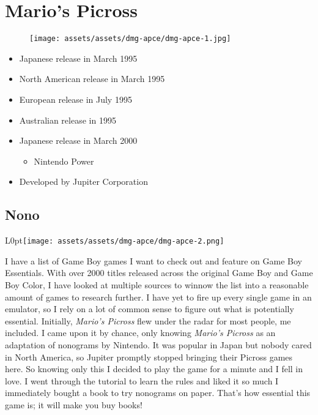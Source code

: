 \documentclass{book}
\begin{document}
\chapter*{Mario’s Picross}
\vspace{\baselineskip}\begin{figure}[H]{\texttt{[image: assets/assets/dmg-apce/dmg-apce-1.jpg]}}\end{figure}\vspace{\baselineskip}
\begin{itemize}[left=0pt, nosep]
\item Japanese release in March 1995
\item North American release in March 1995
\item European release in July 1995
\item Australian release in 1995
\item Japanese release in March 2000
\begin{itemize}
\item Nintendo Power
\end{itemize}
\item Developed by Jupiter Corporation

\end{itemize}
\newpage\FloatBarrier\section*{Nono}
\begin{wrapfigure}{L}{0pt}{\texttt{[image: assets/assets/dmg-apce/dmg-apce-2.png]}}\end{wrapfigure}\noindent
I have a list of Game Boy games I want to check out and feature on Game Boy Essentials. With over 2000 titles released across the original Game Boy and Game Boy Color, I have looked at multiple sources to winnow the list into a reasonable amount of games to research further. I have yet to fire up every single game in an emulator, so I rely on a lot of common sense to figure out what is potentially essential. Initially, \emph{Mario’s Picross} flew under the radar for most people, me included. I came upon it by chance, only knowing \emph{Mario’s Picross} as an adaptation of nonograms by Nintendo. It was popular in Japan but nobody cared in North America, so Jupiter promptly stopped bringing their Picross games here. So knowing only this I decided to play the game for a minute and I fell in love. I went through the tutorial to learn the rules and liked it so much I immediately bought a book to try nonograms on paper. That’s how essential this game is; it will make you buy books!\par
\end{document}
